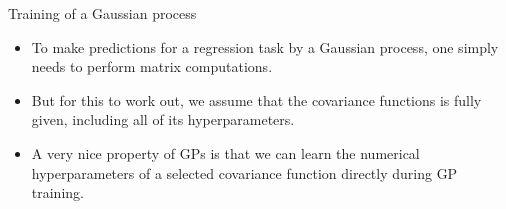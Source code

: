 









\begin{vbframe}{Training of a Gaussian process}

\begin{itemize}
\item To make predictions for a regression task by a Gaussian process, one simply needs to perform matrix computations.
\vspace{.5cm}
\item But for this to work out, we assume that the covariance functions is fully given, including all of its hyperparameters.
\vspace{.5cm}
\item A very nice property of GPs is that we can learn the numerical hyperparameters of a selected covariance function directly during GP training.
\end{itemize}

\end{vbframe}

